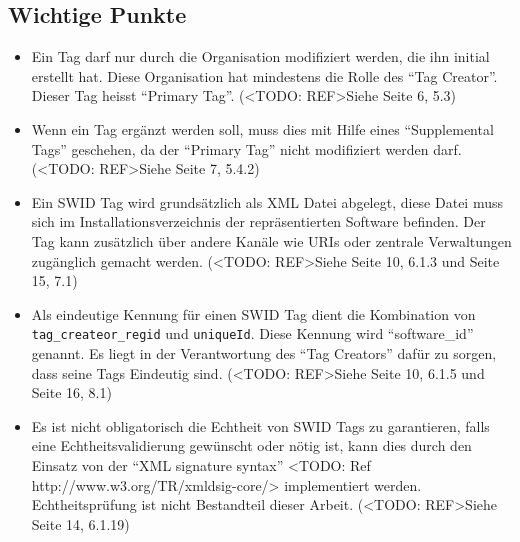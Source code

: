 \subsection{Wichtige Punkte}
\begin{itemize}
	\item Ein Tag darf nur durch die Organisation modifiziert werden, die ihn
	initial erstellt hat. Diese Organisation hat mindestens die Rolle des
	\enquote{Tag Creator}. Dieser Tag heisst \enquote{Primary Tag}. (<TODO:
	REF>Siehe Seite 6, 5.3)
	
	\item Wenn ein Tag ergänzt werden soll, muss dies mit Hilfe eines
	\enquote{Supplemental Tags} geschehen, da der \enquote{Primary Tag} nicht
	modifiziert werden darf. (<TODO: REF>Siehe Seite 7, 5.4.2)
	
	\item Ein SWID Tag wird grundsätzlich als XML Datei abgelegt, diese Datei muss
	sich im Installationsverzeichnis der repräsentierten Software befinden. Der Tag
	kann zusätzlich über andere Kanäle wie URIs oder zentrale Verwaltungen
	zugänglich gemacht werden. (<TODO: REF>Siehe Seite 10, 6.1.3 und Seite 15, 7.1)
	
	\item Als eindeutige Kennung für einen SWID Tag dient die Kombination von
	\texttt{tag\_createor\_regid} und \texttt{uniqueId}. Diese Kennung wird
	\enquote{software\_id} genannt. Es liegt in der Verantwortung des \enquote{Tag
	Creators} dafür zu sorgen, dass seine Tags Eindeutig sind. (<TODO: REF>Siehe
	Seite 10, 6.1.5 und Seite 16, 8.1)
	
	\item Es ist nicht obligatorisch die Echtheit von SWID Tags zu garantieren,
	falls eine Echtheitsvalidierung gewünscht oder nötig ist, kann dies durch den
	Einsatz von der \enquote{XML signature syntax} <TODO: Ref
	http://www.w3.org/TR/xmldsig-core/> implementiert werden. Echtheitsprüfung ist
	nicht Bestandteil dieser Arbeit. (<TODO: REF>Siehe Seite 14, 6.1.19)
	

\end{itemize}
